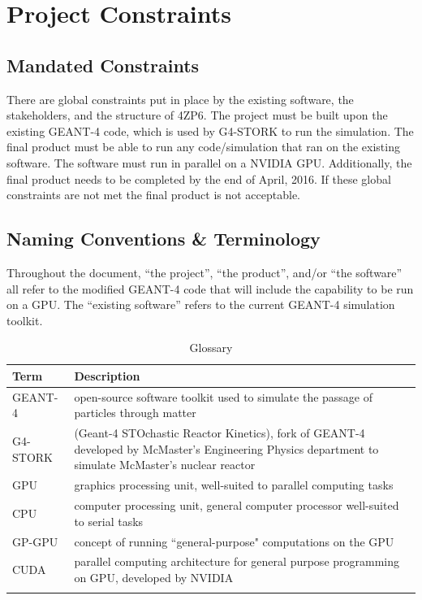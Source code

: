\documentclass[12pt]{article}
\begin{document}
\section{Project Constraints}

\subsection{Mandated Constraints} %
There are global constraints put in place by the existing software, the stakeholders, and the structure of 4ZP6. The project must be built upon the existing GEANT-4 code, which is used by G4-STORK to run the simulation. The final product must be able to run any code/simulation that ran on the existing software. The software must run in parallel on a NVIDIA GPU. Additionally, the final product needs to be completed by the end of April, 2016. If these global constraints are not met the final product is not acceptable.\\

\subsection{Naming Conventions \& Terminology} %
Throughout the document, ``the project'', ``the product'', and/or ``the software'' all refer to the modified GEANT-4 code that will include the capability to be run on a GPU. The ``existing software'' refers to the current GEANT-4 simulation toolkit.\\

\newpage %

\begin{table}[h]
\centering
\caption{Glossary}
\begin{tabularx}{\textwidth}{l|X}
\Xhline{2\arrayrulewidth}
\bf Term & \bf Description\\
\hline
GEANT-4 & open-source software toolkit used to simulate the passage of particles through matter\\\hline
G4-STORK & (Geant-4 STOchastic Reactor Kinetics), fork of GEANT-4 developed by McMaster's Engineering Physics department to simulate McMaster's nuclear reactor\\\hline
GPU & graphics processing unit, well-suited to parallel computing tasks\\\hline
CPU & computer processing unit, general computer processor well-suited to serial tasks\\\hline
GP-GPU & concept of running ``general-purpose" computations on the GPU\\\hline
CUDA & parallel computing architecture for general purpose programming on GPU, developed by NVIDIA\\
\Xhline{2\arrayrulewidth}
\end{tabularx}
\end{table}
\end{document}
